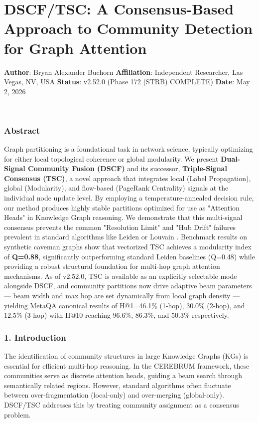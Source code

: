\section{DSCF/TSC: A Consensus-Based Approach to Community Detection for Graph Attention}

\textbf{Author}: Bryan Alexander Buchorn  
\textbf{Affiliation}: Independent Researcher, Las Vegas, NV, USA  
\textbf{Status}: v2.52.0 (Phase 172 (STRB) COMPLETE)
\textbf{Date}: May 2, 2026

---

\subsubsection{Abstract}
Graph parti\-tioning is a found\-ational task in network science, typically optimizing for either local topological coherence or global modularity. We present \textbf{Dual-Signal Community Fusion (DSCF)} and its successor, \textbf{Triple-Signal Consensus (TSC)}, a novel approach that integrates local (Label Propagation), global (Modularity), and flow-based (PageRank Centrality) signals at the individual node update level. By employing a temperature-annealed decision rule, our method produces highly stable partitions optimized for use as "Attention Heads" in Knowledge Graph reasoning. We demonstrate that this multi-signal consensus prevents the common "Resolution Limit" and "Hub Drift" failures prevalent in standard algorithms like Leiden \cite{traag2019louvain} or Louvain \cite{blondel2008louvain}. Benchmark results on synthetic caveman graphs show that vectorized TSC achieves a modularity index of \textbf{Q=0.88}, signi\-ficantly outpe\-rforming standard Leiden baselines (Q=0.48) while providing a robust structural foundation for multi-hop graph attention mechanisms. As of v2.52.0, TSC is available as an explicitly selectable mode alongside DSCF, and community partitions now drive adaptive beam parameters — beam width and max hop are set dynamically from local graph density — yielding MetaQA canonical results of H@1=46.1\% (1-hop), 30.0\% (2-hop), and 12.5\% (3-hop) with H@10 reaching 96.6\%, 86.3\%, and 50.3\% respe\-ctively.

\subsubsection{1. Introd\-uction}
The ident\-ification of community structures in large Knowledge Graphs (KGs) is essential for efficient multi-hop reasoning. In the CEREBRUM framework, these communities serve as discrete attention heads, guiding a beam search through seman\-tically related regions. However, standard algorithms often fluctuate between over-fragm\-entation (local-only) and over-merging (global-only). DSCF/TSC addresses this by treating community assignment as a consensus problem.

